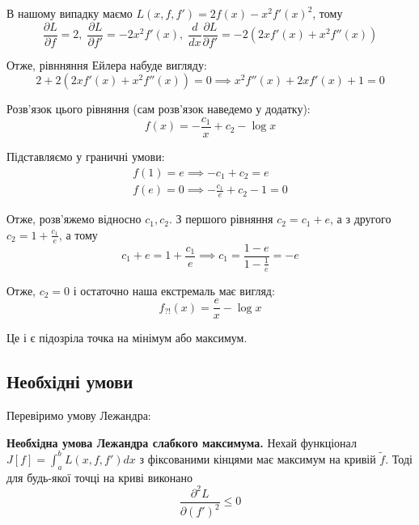 \documentclass[14pt]{extarticle}
\newcommand{\<}{\langle}
\renewcommand{\>}{\rangle}
\theoremstyle{mystyle}{\newtheorem{definition}{Definition}[section]}
\theoremstyle{mystyle}{\newtheorem{proposition}[definition]{Proposition}}
\theoremstyle{mystyle}{\newtheorem{theorem}[definition]{Theorem}}
\theoremstyle{mystyle}{\newtheorem{lemma}[definition]{Lemma}}
\theoremstyle{mystyle}{\newtheorem{corollary}[definition]{Corollary}}
\theoremstyle{mystyle}{\newtheorem*{remark}{Remark}}
\theoremstyle{mystyle}{\newtheorem*{remarks}{Remarks}}
\theoremstyle{mystyle}{\newtheorem*{example}{Example}}
\theoremstyle{mystyle}{\newtheorem*{examples}{Examples}}
\theoremstyle{definition}{\newtheorem*{exercise}{Exercise}}
\theoremstyle{cstyle}{\newtheorem*{cthm}{}}
\theoremstyle{warn}
\begin{document}
В нашому випадку маємо $L(x,f,f') = 2f(x)-x^2f'(x)^2$, тому
\begin{equation}
    \frac{\partial L}{\partial f} = 2, \; \frac{\partial L}{\partial f'} = -2x^2f'(x), \; \frac{d}{dx}\frac{\partial L}{\partial f'} = -2(2xf'(x)+x^2f''(x))
\end{equation}

Отже, рівнняння Ейлера набуде вигляду:
\begin{equation}
    2 + 2(2xf'(x)+x^2f''(x)) = 0 \implies x^2f''(x) + 2xf'(x) + 1 = 0 
\end{equation}

Розв'язок цього рівняння (сам розв'язок наведемо у додатку):
\begin{equation}
    f(x) = -\frac{c_1}{x} + c_2 - \log x
\end{equation}

Підставляємо у граничні умови:
\begin{gather}
    f(1) = e \implies -c_1 + c_2 = e \\
    f(e) = 0 \implies -\frac{c_1}{e} + c_2 - 1 = 0
\end{gather}

Отже, розв'яжемо відносно $c_1,c_2$. З першого рівняння $c_2 = c_1+e$, а з другого $c_2=1+\frac{c_1}{e}$, а тому
\begin{equation}
    c_1 + e = 1 + \frac{c_1}{e} \implies c_1 = \frac{1-e}{1-\frac{1}{e}} = -e
\end{equation}

Отже, $c_2=0$ і остаточно наша екстремаль має вигляд:
\begin{equation}
    \boxed{f_{?!}(x) = \frac{e}{x} - \log x}
\end{equation} 

Це і є підозріла точка на мінімум або максимум.

\subsection{Необхідні умови}

Перевіримо умову Лежандра:

\begin{theorem}
    \textbf{Необхідна умова Лежандра слабкого максимума.} Нехай функціонал $J[f]=\int_a^b L(x,f,f')dx$ з фіксованими кінцями має максимум на кривій $\widetilde{f}$. Тоді для будь-якої точці на криві виконано 
    \begin{equation}
        \frac{\partial^2 L}{\partial (f')^2} \leq 0
    \end{equation}
\end{theorem}
\end{document}
